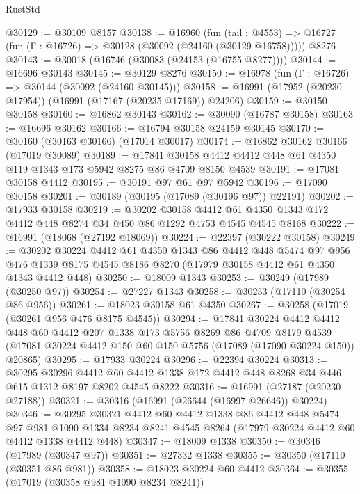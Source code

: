 \begin{lexlean}{RustStd}
\begin{coremodule}
@30129 := @30109 @8157
@30138 := @16960
    (fun (tail : @4553) => @16727 (fun (Γ : @16726) => @30128 (@30092 (@24160 (@30129 @16758)))))
    @8276
@30143 := @30018 (@16746 (@30083 (@24153 (@16755 @8277))))
@30144 := @16696 @30143
@30145 := @30129 @8276
@30150 := @16978 (fun (Γ : @16726) => @30144 (@30092 (@24160 @30145)))
@30158 := @16991 (@17952 (@20230 @17954)) (@16991 (@17167 (@20235 @17169)) @24206)
@30159 := @30150 @30158
@30160 := @16862 @30143
@30162 := @30090 (@16787 @30158)
@30163 := @16696 @30162
@30166 := @16794 @30158 @24159 @30145
@30170 := @30160 (@30163 @30166) (@17014 @30017)
@30174 := @16862 @30162 @30166 (@17019 @30089)
@30189 := @17841 @30158 @4412 @4412 @448 @61 @4350 @119 @1343 @173 @5942 @8275 @86 @4709 @8150 @4539
@30191 := @17081 @30158 @4412
@30195 := @30191 @97 @61 @97 @5942
@30196 := @17090 @30158
@30201 := @30189 (@30195 (@17089 (@30196 @97)) @22191)
@30202 := @17933 @30158
@30219 := @30202
    @30158
    @4412
    @61
    @4350
    @1343
    @172
    @4412
    @448
    @8274
    @34
    @450
    @86
    @1292
    @4753
    @4545
    @4545
    @8168
@30222 := @16991 (@18068 (@27192 @18069))
@30224 := @22397 (@30222 @30158)
@30249 := @30202
    @30224
    @4412
    @61
    @4350
    @1343
    @86
    @4412
    @448
    @5474
    @97
    @956
    @476
    @1339
    @8175
    @4545
    @8186
    @8270
    (@17979 @30158 @4412 @61 @4350 @1343 @4412 @448)
@30250 := @18009 @1343
@30253 := @30249 (@17989 (@30250 @97))
@30254 := @27227 @1343
@30258 := @30253 (@17110 (@30254 @86 @956))
@30261 := @18023 @30158 @61 @4350
@30267 := @30258 (@17019 (@30261 @956 @476 @8175 @4545))
@30294 := @17841
    @30224
    @4412
    @4412
    @448
    @60
    @4412
    @207
    @1338
    @173
    @5756
    @8269
    @86
    @4709
    @8179
    @4539
    (@17081 @30224 @4412 @150 @60 @150 @5756 (@17089 (@17090 @30224 @150)) @20865)
@30295 := @17933 @30224
@30296 := @22394 @30224
@30313 := @30295
    @30296
    @4412
    @60
    @4412
    @1338
    @172
    @4412
    @448
    @8268
    @34
    @446
    @615
    @1312
    @8197
    @8202
    @4545
    @8222
@30316 := @16991 (@27187 (@20230 @27188))
@30321 := @30316 (@16991 (@26644 (@16997 @26646)) @30224)
@30346 := @30295
    @30321
    @4412
    @60
    @4412
    @1338
    @86
    @4412
    @448
    @5474
    @97
    @981
    @1090
    @1334
    @8234
    @8241
    @4545
    @8264
    (@17979 @30224 @4412 @60 @4412 @1338 @4412 @448)
@30347 := @18009 @1338
@30350 := @30346 (@17989 (@30347 @97))
@30351 := @27332 @1338
@30355 := @30350 (@17110 (@30351 @86 @981))
@30358 := @18023 @30224 @60 @4412
@30364 := @30355 (@17019 (@30358 @981 @1090 @8234 @8241))

\end{coremodule}
\end{lexlean}

